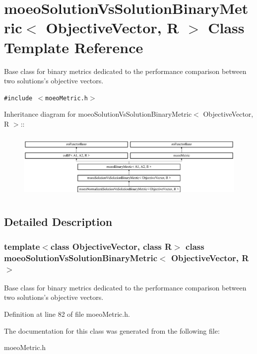 \section{moeo\-Solution\-Vs\-Solution\-Binary\-Metric$<$ Objective\-Vector, R $>$ Class Template Reference}
\label{classmoeoSolutionVsSolutionBinaryMetric}
Base class for binary metrics dedicated to the performance comparison between two solutions's objective vectors.  


{\tt \#include $<$moeo\-Metric.h$>$}

Inheritance diagram for moeo\-Solution\-Vs\-Solution\-Binary\-Metric$<$ Objective\-Vector, R $>$::\begin{figure}[H]
\begin{center}
\leavevmode
\includegraphics[height=3.30189cm]{classmoeoSolutionVsSolutionBinaryMetric}
\end{center}
\end{figure}


\subsection{Detailed Description}
\subsubsection*{template$<$class Objective\-Vector, class R$>$ class moeo\-Solution\-Vs\-Solution\-Binary\-Metric$<$ Objective\-Vector, R $>$}

Base class for binary metrics dedicated to the performance comparison between two solutions's objective vectors. 



Definition at line 82 of file moeo\-Metric.h.

The documentation for this class was generated from the following file:\begin{CompactItemize}
\item 
moeo\-Metric.h\end{CompactItemize}
